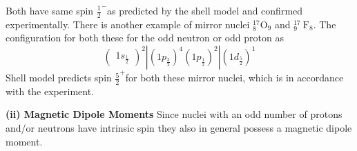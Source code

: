 \begin{enumerate}
$$	$$
	Both have same spin $\frac{1}{2}^{-}$as predicted by the shell model and confirmed experimentally. There is another example of mirror nuclei ${ }_{8}^{17} \mathrm{O}_{9}$ and ${ }_{9}^{17} \mathrm{~F}_{8}$. The configuration for both these for the odd neutron or odd proton as\\
	$$
	\left(\begin{array}{c}
	1 s_{\frac{1}{2}}
	\end{array}\right)^{2}\left|\left(1 p_{\frac{3}{2}}\right)^{4}\left(1 p_{\frac{1}{2}}\right)^{2}\right|\left(1 d_{\frac{5}{2}}\right)^{1}
	$$
	Shell model predicts spin $\frac{5}{2}^{+}$for both these mirror nuclei, which is in accordance with the experiment.\\
\end{enumerate}
\textbf{(ii) Magnetic Dipole Moments}
Since nuclei with an odd number of protons and/or neutrons have intrinsic spin they also in general possess a magnetic dipole moment.

